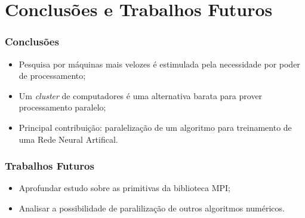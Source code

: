 \section{Conclus\~oes e Trabalhos Futuros}
	\begin{frame}
	 	\frametitle{Conclus\~oes}
		\begin{itemize}
		 	\item Pesquisa por m\'aquinas mais velozes \'e estimulada pela necessidade por poder de processamento;
			\item Um {\it cluster} de computadores \'e uma alternativa barata para prover processamento paralelo;
			\item Principal contribui\c{c}\~ao: paraleliza\c{c}\~ao de um algoritmo para treinamento de uma Rede Neural Artifical. 
		\end{itemize}
	\end{frame}

	\begin{frame}
	 	\frametitle{Trabalhos Futuros}
		\begin{itemize}
			\item Aprofundar estudo sobre as primitivas da biblioteca MPI;
			\item Analisar a possibilidade de paraliliza\c{c}\~ao de outros algoritmos num\'ericos.
		\end{itemize}
	\end{frame}
